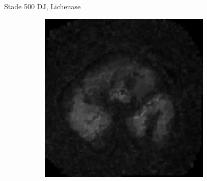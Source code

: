 \documentclass[10pt]{beamer}
\begin{document}
\begin{frame}{Stade 500 DJ, Lichenase}
\begin{figure}[ht]
\begin{subfigure}[t]{0.33\textwidth}
      
    \end{subfigure}%
    \begin{subfigure}[t]{0.33\textwidth}
      \centering
      \includegraphics[width=0.9\textwidth]{fig/stats_500Lich_t2}

    \end{subfigure}%
    
  \end{figure}
\end{frame}
\end{document}
